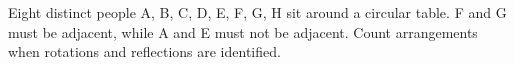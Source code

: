 Eight distinct people A, B, C, D, E, F, G, H sit around a circular table. F and G must be adjacent, while A and E must not be adjacent. Count arrangements when rotations and reflections are identified.
